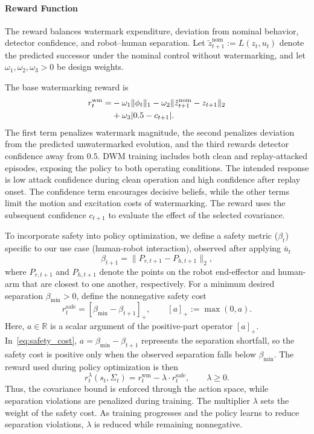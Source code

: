 \documentclass[letterpaper, 10 pt, conference]{ieeeconf}
\theoremstyle{plain}
\begin{document}
\paragraph{Reward Function}
The reward balances watermark expenditure, deviation from nominal
behavior, detector confidence, and robot--human
separation. Let
$\tilde z_{t+1}^{\mathrm{nom}}:=L(z_t,u_t)$ denote the predicted
successor under the nominal control without watermarking, and let
$\omega_1,\omega_2,\omega_3>0$ be design weights.

The base watermarking reward is
\begin{align}\label{eq:base_wm_reward}
    r_t^{\mathrm{wm}}
    =&-\omega_1\|\phi_t\|_1
      -\omega_2\|\tilde z_{t+1}^{\mathrm{nom}}-z_{t+1}\|_2
      \notag\\
     &+\omega_3|0.5-c_{t+1}|.
\end{align}
The first term penalizes watermark magnitude, the second penalizes deviation from the predicted unwatermarked evolution, and the third rewards detector confidence away from $0.5$. DWM training includes both clean and replay-attacked episodes, exposing the policy to both operating conditions. The intended response is low attack confidence during clean operation and high confidence after replay onset. The confidence term encourages decisive beliefs, while the other terms limit the motion and excitation costs of watermarking. The reward uses the subsequent confidence $c_{t+1}$ to evaluate the effect of the selected covariance.

To incorporate safety into policy optimization, we define a safety metric ($\beta_t$) specific to our use case (human-robot interaction), observed after applying $\bar u_t$
\begin{equation}\label{eq:safety_metric}
    \beta_{t+1}
    =
    \|P_{r,t+1}-P_{h,t+1}\|_2,
\end{equation}
where $P_{r,t+1}$ and $P_{h,t+1}$ denote the points on the robot end-effector
and human-arm that are closest to one another, respectively.
For a minimum desired separation $\beta_\text{min}>0$, define the
nonnegative safety cost
\begin{equation}\label{eq:safety_cost}
    r_t^{\mathrm{safe}}
    =
    [\beta_\text{min}-\beta_{t+1}]_+,
    \qquad [a]_+:=\max(0,a).
\end{equation}
Here, $a\in\mathbb{R}$ is a scalar argument of the positive-part
operator $[a]_+$. In~\eqref{eq:safety_cost}, $a=\beta_\text{min}-\beta_{t+1}$
represents the separation shortfall, so the safety cost is positive
only when the observed separation falls below $\beta_\text{min}$.
The reward used during policy optimization is then
\begin{equation}\label{eq:lagrangian_reward}
    r_t^\lambda(s_t,\Sigma_t)
    =
    r_t^{\mathrm{wm}}
    -
    \lambda \cdot r_t^{\mathrm{safe}},
    \qquad \lambda\ge0.
\end{equation}
Thus, the covariance bound is enforced through the action space, while separation violations are penalized during training. The multiplier $\lambda$ sets the weight of the safety cost. As training progresses and the policy learns to reduce separation violations, $\lambda$ is reduced while remaining nonnegative.
\end{document}
